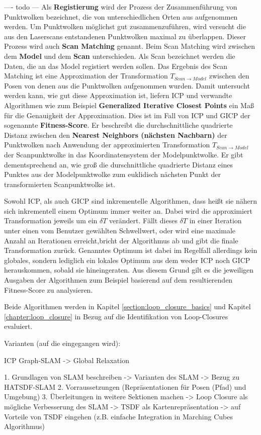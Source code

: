 ---- todo ---
Als \textbf{Registierung} wird der Prozess der Zusammenführung von Punktwolken bezeichnet, die von unterschiedlichen Orten aus aufgenommen werden. Um Punktwolken möglichst gut zusammenzuführen, wird versucht die aus den Laserscans entstandenen Punktwolken maximal zu überlappen. Dieser Prozess wird auch \textbf{Scan Matching} genannt.
Beim Scan Matching wird zwischen dem \textbf{Model} und dem \textbf{Scan} unterschieden.
Als Scan bezeichnet werden die Daten, die an das Model registiert werden sollen.
Das Ergebnis des Scan Matching ist eine Approximation der Transformation $T_{Scan \rightarrow Model}$ zwischen den Posen von denen aus die Punktwolken aufgenommen wurden.
Damit untersucht werden kann, wie gut diese Approximation ist, liefern ICP und verwandte Algorithmen wie zum Beispiel \textbf{Generalized Iterative Closest Points} \cite{segal2009generalized} ein Maß für die Genauigkeit der Approximation. Dies ist im Fall von ICP und GICP der sogenannte \textbf{Fitness-Score}. Er beschreibt die durchschnittliche quadrierte Distanz zwischen den \textbf{Nearest Neighbors (nächsten Nachbarn)} der Punktwolken nach Anwendung der approximierten Transformation $T_{Scan \rightarrow Model}$ der Scanpunktwolke in das Koordinatensystem der Modelpunktwolke.
Er gibt dementsprechend an, wie groß die durschnittliche quadrierte Distanz eines Punktes aus der Modelpunktwolke zum euklidisch nächsten Punkt der transformierten Scanpunktwolke ist.

Sowohl ICP, als auch GICP sind inkrementelle Algorithmen, dass heißt sie nähern sich inkrementell einem Optimum immer weiter an. Dabei wird die approximiert Transformation jeweils um ein $\delta T$ verändert. Fällt dieses $\delta T$ in einer Iteration unter einen vom Benutzer gewählten Schwellwert, oder wird eine maximale Anzahl an Iterationen erreicht,bricht der Algorithmus ab und gibt die finale Transformation zurück.
Genanntes Optimum ist dabei im Regelfall allerdings kein globales, sondern lediglich ein lokales Optimum aus dem weder ICP noch GICP herauskommen, sobald sie hineingeraten.
Aus diesem Grund gilt es die jeweiligen Ausgaben der Algorithmen zum Beispiel basierend auf dem resultierenden Fitness-Score zu analysieren. 

Beide Algorithmen werden in Kapitel \ref{section:loop_closure_basics} und Kapitel \ref{chapter:loop_closure} in Bezug auf die Identifikation von Loop-Closures evaluiert.


Varianten (auf die eingegangen wird): 

ICP
Graph-SLAM -> Global Relaxation


 

1. Grundlagen von SLAM beschreiben
-> Varianten des SLAM
-> Bezug zu HATSDF-SLAM
2. Vorraussetzungen (Repräsentationen für Posen (Pfad) und Umgebung)
3. Überleitungen in weitere Sektionen machen
	-> Loop Closure als mögliche Verbesserung des SLAM
	-> TSDF als Kartenrepräsentation
		-> auf Vorteile von TSDF eingehen (z.B. einfache Integration in Marching Cubes Algorithmus)